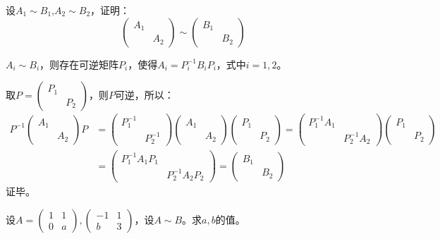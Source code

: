 \documentclass[a4paper]{report}
\begin{document}
\EX 设$A_1\sim B_1$,$A_2\sim B_2$，证明：
\begin{equation*}
\begin{pmatrix}
A_1\\
&A_2
\end{pmatrix}\sim \begin{pmatrix}
B_1\\
&B_2
\end{pmatrix}
\end{equation*}

\begin{zhengming}
$A_i\sim B_i$，则存在可逆矩阵$P_i$，使得$A_i=P_i^{-1}B_iP_i$，式中$i=1,2$。

取$
P=
\begin{pmatrix}
P_1\\
&P_2
\end{pmatrix}
$，则$P$可逆，所以：
\begin{align*}
P^{-1}\begin{pmatrix}
A_1\\
&A_2
\end{pmatrix}P&=
\begin{pmatrix}
P_1^{-1}\\
&P_2^{-1}
\end{pmatrix}\begin{pmatrix}
A_1\\
&A_2
\end{pmatrix}\begin{pmatrix}
P_1\\
&P_2
\end{pmatrix}=
\begin{pmatrix}
P_1^{-1}A_1\\
&P_2^{-1}A_2
\end{pmatrix}\begin{pmatrix}
P_1\\
&P_2
\end{pmatrix}\\&=\begin{pmatrix}
P_1^{-1}A_1P_1\\
&P_2^{-1}A_2P_2
\end{pmatrix}=\begin{pmatrix}
B_1\\
&B_2
\end{pmatrix}
\end{align*}
证毕。
\end{zhengming}

\EX 设$A=
\begin{pmatrix}
1&1\\0&a
\end{pmatrix},\begin{pmatrix}
-1&1\\b&3
\end{pmatrix}
$，设$A\sim B$。求$a,b$的值。
\end{document}
